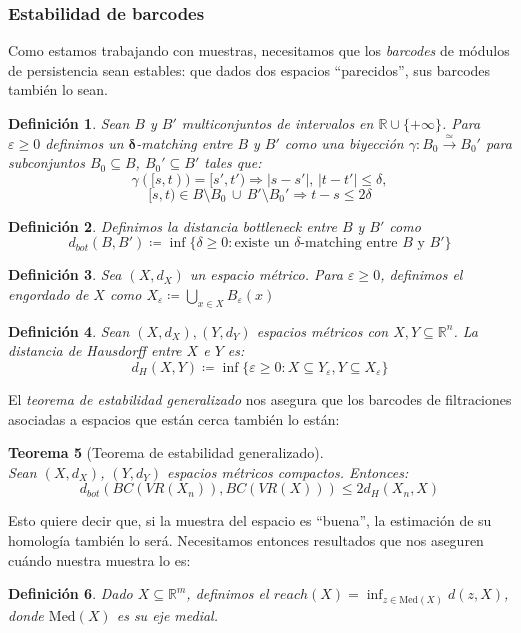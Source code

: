 \documentclass[12pt,a4paper]{article}
\newtheorem{theorem}{Teorema}[section]
\newtheorem{definition}[theorem]{Definición}
\begin{document}
\subsubsection{Estabilidad de barcodes}
Como estamos trabajando con muestras, necesitamos que los \textit{barcodes} de módulos de persistencia sean estables: que dados dos espacios ``parecidos'', sus barcodes también lo sean.
\begin{definition}
    Sean $B$ y $B'$ multiconjuntos de intervalos en $\mathbb{R} \cup \{+\infty\}$. Para $\varepsilon \geq 0$ definimos un $\bm\delta$-matching entre $B$ y $B'$ como una biyección $\gamma: B_0 \xrightarrow{\simeq} B_0'$ para subconjuntos $B_0 \subseteq B$, $B_0' \subseteq B'$ tales que:
    \[
    \gamma([s,t)) = [s',t') \Rightarrow \lvert s-s' \rvert, \, \lvert t-t' \rvert \leq \delta,
    \]
    \[
    [s,t) \in B \setminus B_0 \, \cup \, B' \setminus B_0' \Rightarrow t-s \leq 2\delta
    \]
\end{definition}
\begin{definition}
    Definimos la distancia bottleneck entre $B$ y $B'$ como
    \[
    d_{bot}(B,B') \coloneqq \inf\{\delta \geq 0 : \text{existe un }\delta \text{-matching entre $B$ y $B'$}\}
    \]
\end{definition}
\begin{definition}
    Sea $(X, d_X)$ un espacio métrico. Para $\varepsilon \geq 0$, definimos el engordado de $X$ como $\displaystyle X_\varepsilon \coloneqq \bigcup_{x \in X} B_\varepsilon(x)$
\end{definition}
\begin{definition}
    Sean $(X, d_X), (Y, d_Y)$ espacios métricos con $X, Y \subseteq \mathbb{R}^n$. La distancia de Hausdorff entre $X$ e $Y$ es:
    \[
    d_H(X, Y) \coloneqq \inf \{\varepsilon \geq 0 : X \subseteq Y_\varepsilon, Y \subseteq X_\varepsilon \}
    \]
\end{definition}

El \textit{teorema de estabilidad generalizado} nos asegura que los barcodes de filtraciones asociadas a espacios que están cerca también lo están:
\begin{theorem}[Teorema de estabilidad generalizado]
\\
Sean $(X,d_X)$, $(Y, d_Y)$ espacios métricos compactos. Entonces:
    \[
    d_{bot}(BC(VR(X_n)),BC(VR(X))) \leq 2d_H(X_n,X)
    \]
\end{theorem}

Esto quiere decir que, si la muestra del espacio es ``buena'', la estimación de su homología también lo será. Necesitamos entonces resultados que nos aseguren cuándo nuestra muestra lo es:
\begin{definition}
    Dado $X \subseteq \mathbb{R}^m$, definimos el $reach(X) = \displaystyle \inf_{z \in \text{Med}(X)} d(z, X)$, donde $\text{Med}(X)$ es su eje medial.
\end{definition}
\end{document}

